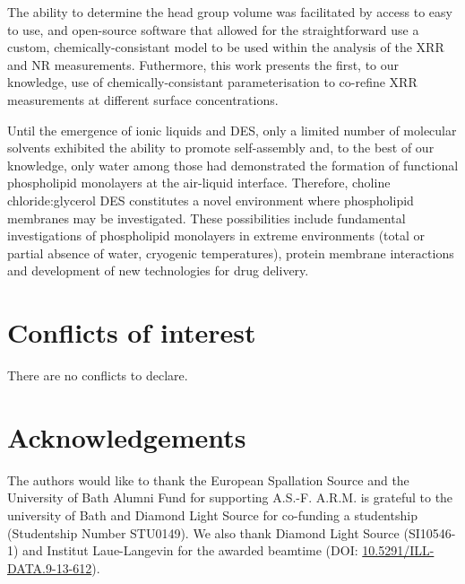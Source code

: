 \documentclass[twoside,twocolumn,9pt]{article}
\renewcommand{\refname}{Notes and references}
\begin{document}
The ability to determine the head group volume was facilitated by access to easy to use, and open-source software that allowed for the straightforward use a custom, chemically-consistant model to be used within the analysis of the XRR and NR measurements. Futhermore, this work presents the first, to our knowledge, use of chemically-consistant parameterisation to co-refine XRR measurements at different surface concentrations. 

Until the emergence of ionic liquids and DES, only a limited number of molecular solvents exhibited the ability to promote self-assembly and, to the best of our knowledge, only water among those had demonstrated the formation of functional phospholipid monolayers at the air-liquid interface. Therefore, choline chloride:glycerol DES constitutes a novel environment where phospholipid membranes may be investigated. These possibilities include fundamental investigations of phospholipid monolayers in extreme environments (total or partial absence of water, cryogenic temperatures), protein membrane interactions and development of new technologies for drug delivery.

\section*{Conflicts of interest}
There are no conflicts to declare.

\section*{Acknowledgements}
The authors would like to thank the European Spallation Source and the University of Bath Alumni Fund for supporting A.S.-F. A.R.M. is grateful to the university of Bath and Diamond Light Source for co-funding a studentship (Studentship Number STU0149). We also thank Diamond Light Source (SI10546-1) and Institut Laue-Langevin for the awarded beamtime (DOI: \href{http://doi.org/10.5291/ILL-DATA.9-13-612}{10.5291/ILL-DATA.9-13-612}).



\balance


\end{document}
